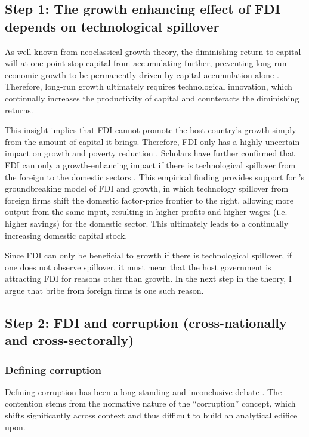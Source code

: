 \subsection{Step 1: The growth enhancing effect of FDI depends on technological spillover}

As well-known from neoclassical growth theory, the diminishing return to capital will at one point stop capital from accumulating further, preventing long-run economic growth to be permanently driven by capital accumulation alone \citep{Solow1956}. Therefore, long-run growth ultimately requires technological innovation, which continually increases the productivity of capital and counteracts the diminishing returns.

This insight implies that FDI cannot promote the host country's growth simply from the amount of capital it brings. Therefore, FDI only has a highly uncertain impact on growth and poverty reduction \citep{Nair-Reichert2001, Carkovic2002, Guerra2009}. Scholars have further confirmed that FDI can only a growth-enhancing impact if there is technological spillover from the foreign to the domestic sectors \citep{Nunnenkamp2004}. This empirical finding provides support for \citet{Findlay1978}'s groundbreaking model of FDI and growth, in which technology spillover from foreign firms shift the domestic factor-price frontier to the right, allowing more output from the same input, resulting in higher profits and higher wages (i.e. higher savings) for the domestic sector. This ultimately leads to a continually increasing domestic capital stock.

Since FDI can only be beneficial to growth if there is technological spillover, if one does not observe spillover, it must mean that the host government is attracting FDI for reasons other than growth. In the next step in the theory, I argue that bribe from foreign firms is one such reason.


\subsection{Step 2: FDI and corruption (cross-nationally and cross-sectorally)}

\subsubsection{Defining corruption}

Defining corruption has been a long-standing and inconclusive debate \citep{Johnston1996}. The contention stems from the normative nature of the ``corruption'' concept, which shifts significantly across context and thus difficult to build an analytical edifice upon. 

